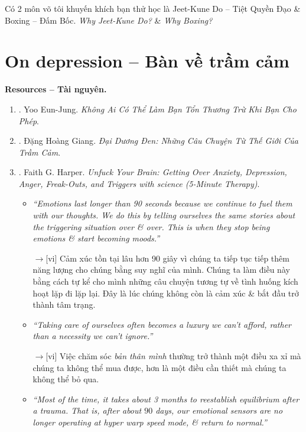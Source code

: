 \documentclass[12pt,oneside]{book}
\begin{document}
Có 2 môn võ tôi khuyến khích bạn thử học là Jeet-Kune Do -- Tiệt Quyền Đạo \& Boxing -- Đấm Bốc. {\it Why Jeet-Kune Do?} \& {\it Why Boxing?}


\section{On depression -- Bàn về trầm cảm}
{\bf \textsf{Resources -- Tài nguyên.}}
\begin{enumerate}
	\item \cite{Eun-Jung_hurt_VN}. {\sc Yoo Eun-Jung}. {\it Không Ai Có Thể Làm Bạn Tổn Thương Trừ Khi Bạn Cho Phép}.
	\item \cite{Giang_dai_duong_den}. {\sc Đặng Hoàng Giang}. {\it Đại Dương Đen: Những Câu Chuyện Từ Thế Giới Của Trầm Cảm}.
	\item \cite{Harper_unfuck_brain}. {\sc Faith G. Harper}. {\it Unfuck Your Brain: Getting Over Anxiety, Depression, Anger, Freak-Outs, and Triggers with science (5-Minute Therapy)}.
	\begin{itemize}
		\item {\it``Emotions last longer than 90 seconds because we continue to fuel them with our thoughts. We do this by telling ourselves the same stories about the triggering situation over \& over. This is when they stop being emotions \& start becoming moods.''}
		
		{\sf[en]$\to$[vi]} Cảm xúc tồn tại lâu hơn 90 giây vì chúng ta tiếp tục tiếp thêm năng lượng cho chúng bằng suy nghĩ của mình. Chúng ta làm điều này bằng cách tự kể cho mình những câu chuyện tương tự về tình huống kích hoạt lặp đi lặp lại. Đây là lúc chúng không còn là cảm xúc \& bắt đầu trở thành tâm trạng.
		
		\item {\it``Taking care of {\rm ourselves} often becomes a luxury we can't afford, rather than a necessity we can't ignore.''}
		
		{\sf[en]$\to$[vi]} Việc chăm sóc {\it bản thân mình} thường trở thành một điều xa xỉ mà chúng ta không thể mua được, hơn là một điều cần thiết mà chúng ta không thể bỏ qua.
		
		\item {\it``Most of the time, it takes about 3 months to reestablish equilibrium after a trauma. That is, after about $90$ days, our emotional sensors are no longer operating at hyper warp speed mode, \& return to normal.''}
		

\end{itemize}
\end{enumerate}
\end{document}
